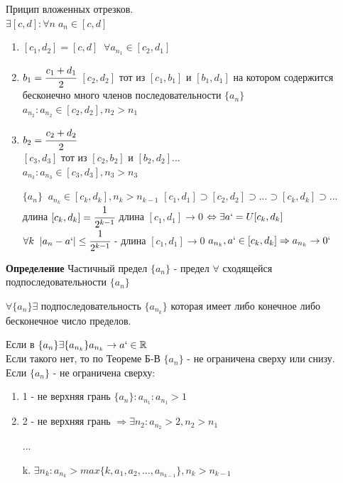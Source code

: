 \documentclass[12pt, paper]{article}
\newcommand{\R}{\mathbb{R}}
\begin{document}
\begin{tcolorbox}[title=Доказательство]
    Прицип вложенных отрезков.\\
    $\exists [c,d]: \forall n\; a_n\in[c,d]$
    \begin{enumerate}
        \item $[c_1,d_2] = [c,d] \;\; \forall a_{n_1} \in [c_2,d_1]$
        \item $b_1 = \cfrac{c_1+d_1}{2}$
                $[c_2,d_2]$ тот из $[c_1,b_1]$ и $[b_1,d_1]$ на котором содержится бесконечно много членов последовательности $\{a_n\}$\\
        $a_{n_2}: a_{n_2} \in [c_2,d_2], n_2>n_1$
        \item $b_2 = \cfrac{c_2+d_2}{2}$\\
        $[c_3,d_3]$ тот из $[c_2,b_2]$ и $[b_2,d_2] ...$\\
        $a_{n_3}: a_{n_3} \in [c_3,d_3], n_3>n_3$

        $\{a_n\} \;\;a_{n_k} \in [c_k,d_k], n_k > n_{k-1}$
        $[c_1,d_1] \supset [c_2,d_2] \supset ... \supset [c_k,d_k] \supset ...$\\
        длина $[c_k,d_k] = \cfrac{1}{2^{k-1}}$
        длина $[c_1,d_1] \to 0$
        $\Leftrightarrow \exists a` = U[c_k,d_k]$\\
        $\forall k\;\; |a_n-a`| \leq \cfrac{1}{2^{k-1}}$ - длина $[c_1,d_1] \to 0$
        $a_{n_k}, a`\in [c_k,d_k] \Rightarrow a_{n_k} \to 0`$
    \end{enumerate}
\end{tcolorbox}

\begin{tcolorbox}
    \textbf{Определение} Частичный предел $\{a_n\}$ - предел $\forall$ сходящейся подпоследовательности $\{a_n\}$
\end{tcolorbox}
\begin{tcolorbox}[title=Следствие из теоремы]
    $\forall \{a_n\} \exists$ подпоследовательность $\{a_{n_k}\}$ которая имеет либо конечное либо бесконечное число пределов.
\end{tcolorbox}
\begin{tcolorbox}[title=Доказательство]
    Если в $\{a_n\} \exists \{a_{n_k}\} a_{n_k} \to a` \in \R$\\
    Если такого нет, то по Теореме Б-В $\{a_{n}\}$ - не ограничена сверху или снизу.\\

    Если $\{a_{n}\} $ - не ограничена сверху:
    \begin{enumerate}
        \item 1 - не верхняя грань $\{a_{n}\}: a_{n_1}: a_{n_1} > 1$
        \item 2 - не верхняя грань $\Rightarrow \exists n_2: a_{n_2}>2, n_2>n_1$
        \item[...]
        \item [k.] $\exists n_k: a_{n_k}>max\{k, a_1, a_2, ..., a_{n_{k-1}}\}, n_k>n_{k-1}$
    \end{enumerate}
\end{tcolorbox}
\end{document}
